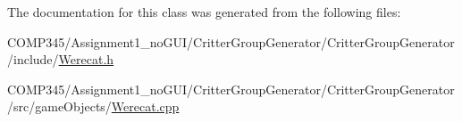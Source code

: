 The documentation for this class was generated from the following files\+:\begin{DoxyCompactItemize}
\item 
C\+O\+M\+P345/\+Assignment1\+\_\+no\+G\+U\+I/\+Critter\+Group\+Generator/\+Critter\+Group\+Generator/include/\hyperlink{_werecat_8h}{Werecat.\+h}\item 
C\+O\+M\+P345/\+Assignment1\+\_\+no\+G\+U\+I/\+Critter\+Group\+Generator/\+Critter\+Group\+Generator/src/game\+Objects/\hyperlink{_werecat_8cpp}{Werecat.\+cpp}\end{DoxyCompactItemize}
